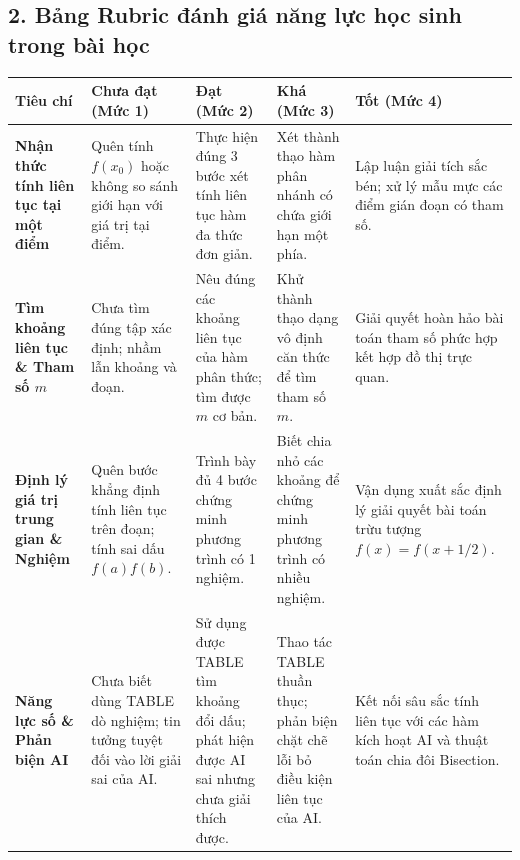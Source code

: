 \documentclass[12pt, a4paper]{article}
\begin{document}
\subsection*{2. Bảng Rubric đánh giá năng lực học sinh trong bài học}

\begin{center}
\small
\begin{tabularx}{\textwidth}{|p{2.8cm}|X|X|X|X|}
\hline
\textbf{Tiêu chí} & \textbf{Chưa đạt (Mức 1)} & \textbf{Đạt (Mức 2)} & \textbf{Khá (Mức 3)} & \textbf{Tốt (Mức 4)} \\ \hline
\textbf{Nhận thức tính liên tục tại một điểm} & Quên tính $f(x_0)$ hoặc không so sánh giới hạn với giá trị tại điểm. & Thực hiện đúng 3 bước xét tính liên tục hàm đa thức đơn giản. & Xét thành thạo hàm phân nhánh có chứa giới hạn một phía. & Lập luận giải tích sắc bén; xử lý mẫu mực các điểm gián đoạn có tham số. \\ \hline
\textbf{Tìm khoảng liên tục \& Tham số $m$} & Chưa tìm đúng tập xác định; nhầm lẫn khoảng và đoạn. & Nêu đúng các khoảng liên tục của hàm phân thức; tìm được $m$ cơ bản. & Khử thành thạo dạng vô định căn thức để tìm tham số $m$. & Giải quyết hoàn hảo bài toán tham số phức hợp kết hợp đồ thị trực quan. \\ \hline
\textbf{Định lý giá trị trung gian \& Nghiệm} & Quên bước khẳng định tính liên tục trên đoạn; tính sai dấu $f(a)f(b)$. & Trình bày đủ 4 bước chứng minh phương trình có 1 nghiệm. & Biết chia nhỏ các khoảng để chứng minh phương trình có nhiều nghiệm. & Vận dụng xuất sắc định lý giải quyết bài toán trừu tượng $f(x) = f(x + 1/2)$. \\ \hline
\textbf{Năng lực số \& Phản biện AI} & Chưa biết dùng TABLE dò nghiệm; tin tưởng tuyệt đối vào lời giải sai của AI. & Sử dụng được TABLE tìm khoảng đổi dấu; phát hiện được AI sai nhưng chưa giải thích được. & Thao tác TABLE thuần thục; phản biện chặt chẽ lỗi bỏ điều kiện liên tục của AI. & Kết nối sâu sắc tính liên tục với các hàm kích hoạt AI và thuật toán chia đôi Bisection. \\ \hline
\end{tabularx}
\end{center}
\end{document}

